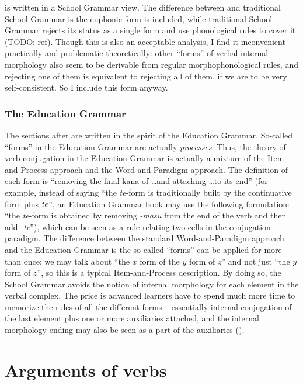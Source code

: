 \documentclass[UTF8, a4paper, oneside, scheme=plain]{ctexrep}
\newcommand{\corpus}[1]{\emph{#1}}
\begin{document}
 is written in a School Grammar view.
The difference between  and traditional School Grammar 
is the euphonic form is included,
while traditional School Grammar rejects its status as a single form
and use phonological rules to cover it (TODO: ref).
Though this is also an acceptable analysis,
I find it inconvenient practically and problematic theoretically:
other ``forms'' of verbal internal morphology also seem to
be derivable from regular morphophonological rules,
and rejecting one of them is equivalent to rejecting all of them,
if we are to be very self-consistent.
So I include this form anyway.

\subsection{The Education Grammar}

The sections after  are written in the spirit of the Education Grammar.
So-called ``forms'' in the Education Grammar are actually \emph{processes}.
Thus, the theory of verb conjugation in the Education Grammar 
is actually a mixture of the Item-and-Process approach and the Word-and-Paradigm approach.
The definition of each form is 
``removing the final kana of \dots and attaching \dots to its end''
(for example, instead of saying ``the \corpus{te}-form is traditionally built by 
the continuative form plus $\corpus{te}$'',
an Education Grammar book may use the following formulation:
``the \corpus{te}-form is obtained by removing \corpus{-masu} from the end of the verb 
and then add \corpus{-te}''),
which can be seen as a rule relating two cells in the conjugation paradigm.
The difference between the standard Word-and-Paradigm approach and the Education Grammar 
is the so-called ``forms'' can be applied for more than once:
we may talk about ``the $x$ form of the $y$ form of $z$''
and not just ``the $y$ form of $z$'',
so this is a typical Item-and-Process description.
By doing so, the School Grammar avoids 
the notion of internal morphology for each element in the verbal complex.
The price is advanced learners have to spend much more time to memorize the rules of all the different forms 
-- essentially internal conjugation of the last element plus one or more auxiliaries attached,
and the internal morphology ending may also be seen as a part of the auxiliaries 
().

\chapter{Arguments of verbs}\label{chap:arguments}
\end{document}
